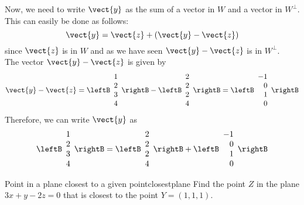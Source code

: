 \begin{solution}
Now, we need to write $\vect{y}$ as the sum of a vector in $W$ and a
vector in $W^{\perp}$. This can easily be done as follows:
\[
\vect{y} = \vect{z} + (\vect{y} - \vect{z})
\]
since $\vect{z}$ is in $W$ and as we have seen $\vect{y} - \vect{z}$ is in  $W^{\perp}$. \\
The vector $\vect{y} - \vect{z}$ is given by 
\[
\vect{y} - \vect{z} = \leftB
\begin{array}{c}
1 \\
2 \\
3 \\
4 
\end{array}
\rightB
-
\leftB
\begin{array}{c}
2 \\
2 \\
2 \\
4 
\end{array}
\rightB
 = 
\leftB
\begin{array}{r}
-1 \\
0 \\
1 \\
0
\end{array}
\rightB
\]
Therefore, we can write $\vect{y}$ as
\[
\leftB
\begin{array}{c}
1 \\
2 \\
3 \\
4 
\end{array}
\rightB
=
\leftB
\begin{array}{c}
2 \\
2 \\
2 \\
4 
\end{array}
\rightB
+
\leftB
\begin{array}{r}
-1 \\
0 \\
1 \\
0
\end{array}
\rightB
\]
\end{solution}

\begin{example}{Point in a plane closest to a given point}{closestplane}
Find the point $Z$ in the plane $3x+y-2z=0$ that is closest to
the point $Y=(1,1,1)$.
\end{example}

